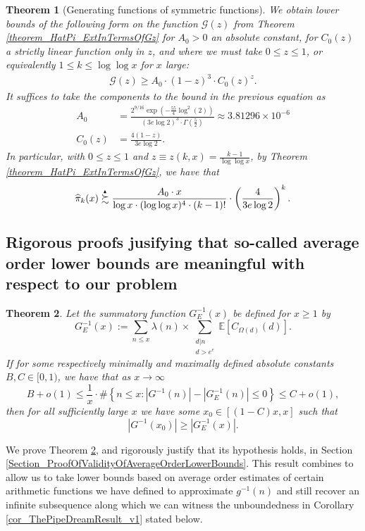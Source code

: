 \documentclass[11pt,reqno,a4letter]{article}
\numberwithin{figure}{section}
\numberwithin{table}{section}
\theoremstyle{plain}
\newtheorem{theorem}{Theorem}
\numberwithin{theorem}{section}
\theoremstyle{definition}
\newcommand{\SuccSim}[0]{\overset{_{\scriptsize{\blacktriangle}}}{\succsim}}
\begin{document}
\begin{theorem}[Generating functions of symmetric functions] 
\label{theorem_GFs_SymmFuncs_SumsOfRecipOfPowsOfPrimes} 
\label{cor_BoundsOnGz_FromMVBook_initial_stmt_v1} 
We obtain lower bounds of the following form on the function 
$\mathcal{G}(z)$ from Theorem \ref{theorem_HatPi_ExtInTermsOfGz} 
for $A_0 > 0$ an absolute constant, for 
$C_0(z)$ a strictly linear function only in $z$, and 
where we must take $0 \leq z \leq 1$, or equivalently $1 \leq k \leq \log\log x$ for $x$ large: 
\begin{align*} 
\mathcal{G}(z) \geq A_0 \cdot (1-z)^{3} \cdot C_0(z)^{z}. 
\end{align*} 
It suffices to take the components to the bound in the previous equation as 
\begin{align*}
A_0 & = \frac{2^{9/16} \exp\left(-\frac{55}{4} \log^2(2)\right)}{ 
     (3e\log 2)^3 \cdot \Gamma\left(\frac{5}{2}\right)} \approx 3.81296 \times 10^{-6} \\ 
C_0(z) & = \frac{4(1-z)}{3e \log 2}. 
\end{align*} 
In particular, with $0 \leq z \leq 1$ and 
$z \equiv z(k, x) = \frac{k-1}{\log\log x}$, by Theorem \ref{theorem_HatPi_ExtInTermsOfGz}, 
we have that 
\[
\widehat{\pi}_k(x) \SuccSim \frac{A_0 \cdot x}{\log x \cdot (\log\log x)^4 \cdot (k-1)!} \cdot 
     \left(\frac{4}{3e\log 2}\right)^{k}.
\]
\end{theorem} 

\subsection{Rigorous proofs jusifying that so-called average order lower bounds are 
            meaningful with respect to our problem} 

\begin{theorem} 
\label{theorem_CondAvgOrderGInvxSummatoryFunc_v1} 
Let the summatory function $G_E^{-1}(x)$ be defined for $x \geq 1$ by 
\[
G_E^{-1}(x) := \sum_{n \leq x} \lambda(n) \times \sum_{\substack{d|n \\ d > e^e}} 
     \mathbb{E}[C_{\Omega(d)}(d)]. 
\]
If for some respectively minimally and maximally defined absolute constants 
$B, C \in [0, 1)$, we have that as $x \rightarrow \infty$
\[
B + o(1) \leq \frac{1}{x} \cdot \#\left\{n \leq x: |G^{-1}(n)| - |G_E^{-1}(n)| \leq 0\right\} \leq 
     C + o(1), 
\]
then for all sufficiently large $x$ we have some 
$x_0 \in [(1-C) x, x]$ such that 
\[
|G^{-1}(x_0)| \geq \left\lvert G_E^{-1}(x) \right\rvert. 
\]
\end{theorem} 
We prove Theorem \ref{theorem_CondAvgOrderGInvxSummatoryFunc_v1}, and 
rigorously justify that its hypothesis holds, in 
Section \ref{Section_ProofOfValidityOfAverageOrderLowerBounds}.  
This result combines to allow us to take lower bounds based on average order estimates of 
certain arithmetic functions we have defined to approximate $g^{-1}(n)$ and still recover 
an infinite subsequence along which we can witness the unboundedness in 
Corollary \ref{cor_ThePipeDreamResult_v1} stated below. 
\end{document}
